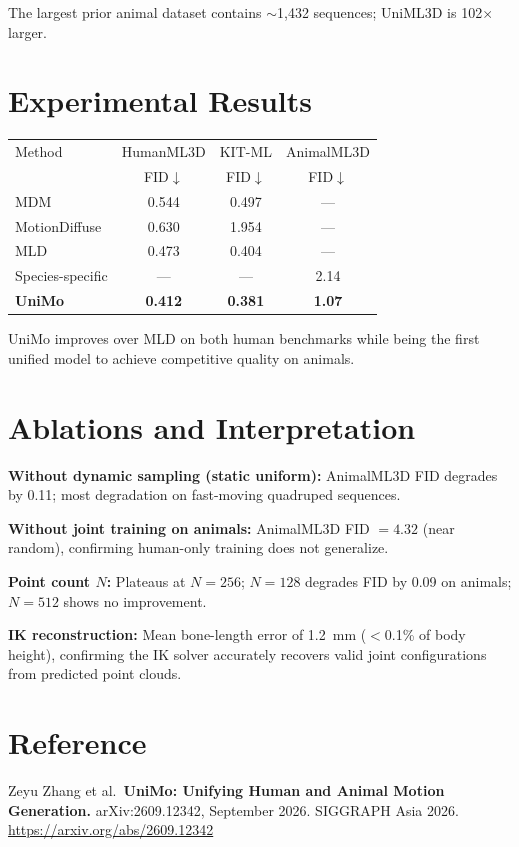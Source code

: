 \documentclass[10pt,twocolumn]{article}
\begin{document}
The largest prior animal dataset contains $\sim$1,432 sequences;
UniML3D is 102$\times$ larger.

\section{Experimental Results}

\begin{center}
\begin{tabular}{lccc}
\toprule
Method & HumanML3D & KIT-ML & AnimalML3D \\
       & FID$\downarrow$ & FID$\downarrow$ & FID$\downarrow$ \\
\midrule
MDM            & 0.544 & 0.497 & --- \\
MotionDiffuse  & 0.630 & 1.954 & --- \\
MLD            & 0.473 & 0.404 & --- \\
Species-specific & ---  & ---  & 2.14 \\
\textbf{UniMo} & \textbf{0.412} & \textbf{0.381} & \textbf{1.07} \\
\bottomrule
\end{tabular}
\end{center}

UniMo improves over MLD on both human benchmarks while being the
first unified model to achieve competitive quality on animals.

\section{Ablations and Interpretation}

\textbf{Without dynamic sampling (static uniform):} AnimalML3D FID
degrades by 0.11; most degradation on fast-moving quadruped sequences.

\textbf{Without joint training on animals:} AnimalML3D FID $= 4.32$
(near random), confirming human-only training does not generalize.

\textbf{Point count $N$:} Plateaus at $N=256$; $N=128$ degrades FID
by 0.09 on animals; $N=512$ shows no improvement.

\textbf{IK reconstruction:} Mean bone-length error of 1.2~mm
($<$0.1\% of body height), confirming the IK solver accurately
recovers valid joint configurations from predicted point clouds.

\section*{Reference}

Zeyu Zhang et al.\ \textbf{UniMo: Unifying Human and Animal Motion
Generation.} arXiv:2609.12342, September 2026. SIGGRAPH Asia 2026.
\url{https://arxiv.org/abs/2609.12342}
\end{document}
